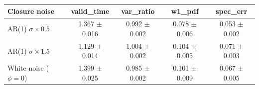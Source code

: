 \begin{tabular}{lcccc}
\toprule
Closure noise & valid\_time & var\_ratio & w1\_pdf & spec\_err \\
\midrule
AR(1) $\sigma\times0.5$ & 1.367 $\pm$ 0.016 & 0.992 $\pm$ 0.002 & 0.078 $\pm$ 0.006 & 0.053 $\pm$ 0.002 \\
AR(1) $\sigma\times1.5$ & 1.129 $\pm$ 0.014 & 1.004 $\pm$ 0.002 & 0.104 $\pm$ 0.005 & 0.071 $\pm$ 0.003 \\
White noise ($\phi\!=\!0$) & 1.399 $\pm$ 0.025 & 0.985 $\pm$ 0.002 & 0.101 $\pm$ 0.009 & 0.067 $\pm$ 0.005 \\
\bottomrule
\end{tabular}
